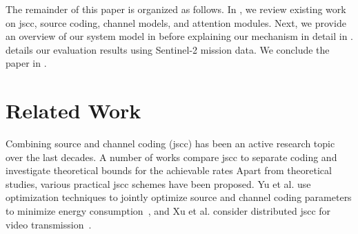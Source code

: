 \documentclass[conference]{IEEEtran}
\newcommand\sentinelii{Sentinel-2\xspace}
\begin{document}
The remainder of this paper is organized as follows.
In , we review existing work on \ac{jscc}, source coding, channel models, and attention modules.
Next, we provide an overview of our system model in  before explaining our mechanism in detail in .
 details our evaluation results using \sentinelii mission data.
We conclude the paper in .

\section{Related Work}
\label{sec:related_work}

Combining source and channel coding (\acs{jscc}) has been an active research topic over the last decades.
A number of works compare \ac{jscc} to separate coding and investigate theoretical bounds for the achievable rates \cite{gallager1968information,1614076,4557472}
Apart from theoretical studies, various practical \ac{jscc} schemes have been proposed.
Yu et al. use optimization techniques to jointly optimize source and channel coding parameters to minimize energy consumption~\cite{Wei2004}, and
Xu et al. consider distributed \ac{jscc} for video transmission~\cite{4205066}. 
\end{document}
